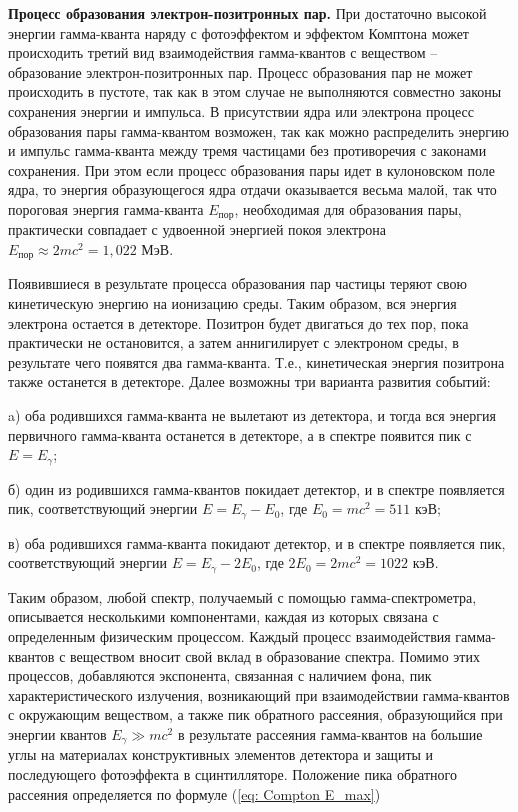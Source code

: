 \documentclass[a4paper,12pt]{article}
\begin{document}
\textbf{Процесс образования электрон-позитронных пар.} При достаточно высокой энергии гамма-кванта наряду с фотоэффектом и эффектом Комптона может происходить третий вид взаимодействия гамма-квантов с веществом -- образование электрон-позитронных пар. Процесс образования пар не может происходить в пустоте, так как в этом случае не выполняются совместно законы сохранения энергии и импульса. В присутствии ядра или электрона процесс образования пары гамма-квантом возможен, так как можно распределить энергию и импульс гамма-кванта между тремя частицами без противоречия с законами сохранения. При этом если процесс образования пары
идет в кулоновском поле ядра, то энергия образующегося ядра отдачи оказывается весьма малой, так что пороговая энергия гамма-кванта $E_\text{пор}$, необходимая для образования пары, практически совпадает с удвоенной энергией покоя электрона $E_\text{пор} \approx 2mc^2 = 1,022$ МэВ.

Появившиеся в результате процесса образования пар частицы теряют свою кинетическую энергию на ионизацию среды. Таким образом, вся энергия электрона остается в детекторе. Позитрон будет двигаться до тех пор, пока практически не остановится, а затем аннигилирует с электроном среды, в результате чего появятся два гамма-кванта. Т.е., кинетическая энергия позитрона также останется в детекторе. Далее возможны три варианта развития событий: \par
a) оба родившихся гамма-кванта не вылетают из детектора, и тогда вся энергия первичного гамма-кванта останется в детекторе, а в спектре появится пик с $E = E_\gamma$; \par
б) один из родившихся гамма-квантов покидает детектор, и в спектре появляется пик, соответствующий энергии $E = E_\gamma - E_0$, где $E_0= mc^2 = 511$ кэВ; \par
в) оба родившихся гамма-кванта покидают детектор, и в спектре появляется пик, соответствующий энергии $E = E_\gamma - 2E_0$, где $2E_0= 2mc^2 = 1022$ кэВ. \par

Таким образом, любой спектр, получаемый с помощью гамма-спектрометра, описывается несколькими компонентами, каждая из которых связана с определенным физическим процессом. Каждый процесс взаимодействия гамма-квантов с веществом вносит свой вклад в образование спектра. Помимо этих процессов, добавляются экспонента, связанная с наличием фона, пик характеристического излучения, возникающий при взаимодействии гамма-квантов с окружающим веществом, а также пик обратного рассеяния, образующийся при энергии квантов $E_\gamma \gg mc^2$ в результате рассеяния гамма-квантов на большие углы на материалах конструктивных элементов детектора и защиты и последующего фотоэффекта в сцинтилляторе. Положение пика обратного рассеяния определяется по формуле (\ref{eq: Compton E_max})
\end{document}
